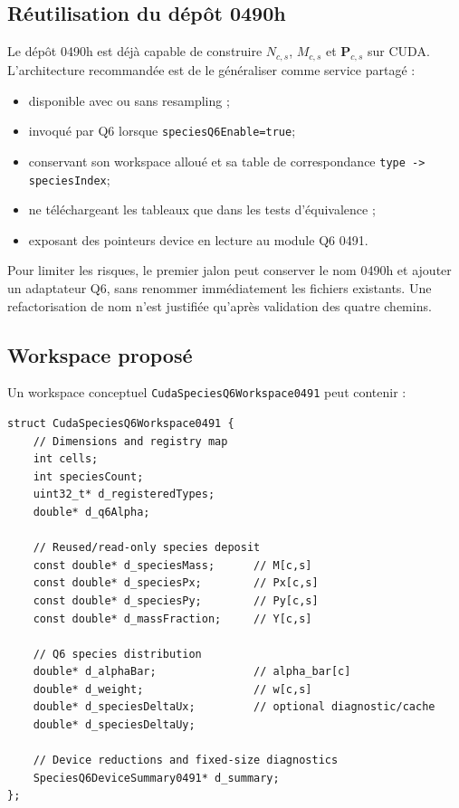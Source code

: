 \documentclass[11pt,a4paper]{article}
\newcommand{\code}[1]{\texttt{#1}}
\newcommand{\vect}[1]{\bm{#1}}
\begin{document}
\subsection{Réutilisation du dépôt 0490h}

Le dépôt 0490h est déjà capable de construire \(N_{c,s}\), \(M_{c,s}\) et \(\vect{P}_{c,s}\) sur CUDA. L'architecture recommandée est de le généraliser comme service partagé :
\begin{itemize}
  \item disponible avec ou sans resampling ;
  \item invoqué par Q6 lorsque \code{speciesQ6Enable=true};
  \item conservant son workspace alloué et sa table de correspondance \code{type -> speciesIndex};
  \item ne téléchargeant les tableaux que dans les tests d'équivalence ;
  \item exposant des pointeurs device en lecture au module Q6 0491.
\end{itemize}

Pour limiter les risques, le premier jalon peut conserver le nom 0490h et ajouter un adaptateur Q6, sans renommer immédiatement les fichiers existants. Une refactorisation de nom n'est justifiée qu'après validation des quatre chemins.

\subsection{Workspace proposé}

Un workspace conceptuel \code{CudaSpeciesQ6Workspace0491} peut contenir :
\begin{lstlisting}
struct CudaSpeciesQ6Workspace0491 {
    // Dimensions and registry map
    int cells;
    int speciesCount;
    uint32_t* d_registeredTypes;
    double* d_q6Alpha;

    // Reused/read-only species deposit
    const double* d_speciesMass;      // M[c,s]
    const double* d_speciesPx;        // Px[c,s]
    const double* d_speciesPy;        // Py[c,s]
    const double* d_massFraction;     // Y[c,s]

    // Q6 species distribution
    double* d_alphaBar;               // alpha_bar[c]
    double* d_weight;                 // w[c,s]
    double* d_speciesDeltaUx;         // optional diagnostic/cache
    double* d_speciesDeltaUy;

    // Device reductions and fixed-size diagnostics
    SpeciesQ6DeviceSummary0491* d_summary;
};
\end{lstlisting}
\end{document}
